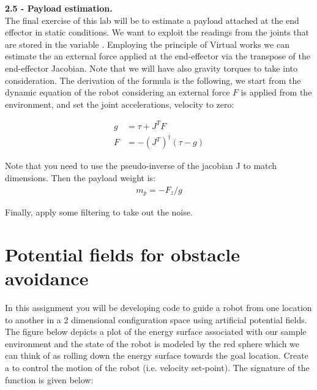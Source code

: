 \documentclass[11pt]{article}
\begin{document}
 
\textbf{2.5 - Payload estimation.}\\
The final exercise of this lab will be to estimate a payload attached at the end effector in static conditions. We want to exploit the readings from the  joints that are stored in the variable . Employing the principle of Virtual works we can estimate the an external force applied at the end-effector via the transpose of the end-effector Jacobian. Note that we will have also gravity torques to take into consideration.
The derivation of the formula is the following, we start from the dynamic equation of the robot considering an external force $F$ is applied from the environment, and set the joint accelerations, velocity to zero:

\begin{align*}
g &= \tau  + J^TF \\
F &= -(J^T)^\dagger (\tau - g) 
\end{align*}

Note that you need to use the pseudo-inverse of the jacobian J to match dimensions.  Then the payload weight is:
\begin{align*}
m_p = -F_z / g 
\end{align*}

Finally, apply some filtering to take out the noise. 




\section{Potential fields for obstacle avoidance}
In this assignment you will be developing code to guide a robot from one location to another in a
2 dimensional configuration space using artificial potential fields. The figure below depicts a plot of
the energy surface associated with our sample environment and the state of the robot is modeled by
the red sphere which we can think of as rolling down the energy surface towards the goal location.
Create a  to control the motion of the robot (i.e. velocity set-point).
The signature of the function is given below:

\end{document}
